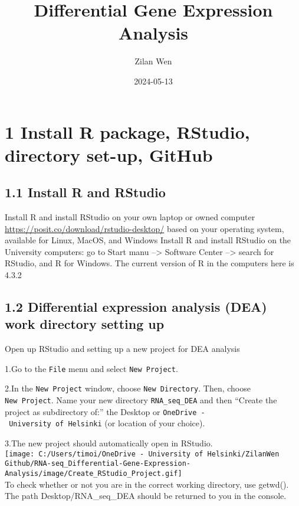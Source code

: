 \documentclass[
]{article}
\title{Differential Gene Expression Analysis}
\author{Zilan Wen}
\date{2024-05-13}
\begin{document}
\maketitle

\section{1 Install R package, RStudio, directory set-up,
GitHub}\label{install-r-package-rstudio-directory-set-up-github}

\subsection{1.1 Install R and RStudio}\label{install-r-and-rstudio}

Install R and install RStudio on your own laptop or owned computer
\url{https://posit.co/download/rstudio-desktop/} based on your operating
system, available for Linux, MacOS, and Windows Install R and install
RStudio on the University computers: go to Start manu --\textgreater{}
Software Center --\textgreater{} search for RStudio, and R for Windows.
The current version of R in the computers here is 4.3.2

\subsection{1.2 Differential expression analysis (DEA) work directory
setting
up}\label{differential-expression-analysis-dea-work-directory-setting-up}

Open up RStudio and setting up a new project for DEA analysis

1.Go to the \texttt{File} menu and select \texttt{New\ Project}.

2.In the \texttt{New\ Project} window, choose \texttt{New\ Directory}.
Then, choose \texttt{New\ Project}. Name your new directory
\texttt{RNA\_seq\_DEA} and then ``Create the project as subdirectory
of:'' the Desktop or \texttt{OneDrive\ -\ University\ of\ Helsinki} (or
location of your choice).

3.The new project should automatically open in RStudio.\\

\texttt{[image: C:/Users/timoi/OneDrive - University of Helsinki/ZilanWen Github/RNA-seq\_Differential-Gene-Expression-Analysis/image/Create\_RStudio\_Project.gif]}\\

To check whether or not you are in the correct working directory, use
getwd(). The path Desktop/RNA\_seq\_DEA should be returned to you in the
console.
\end{document}
